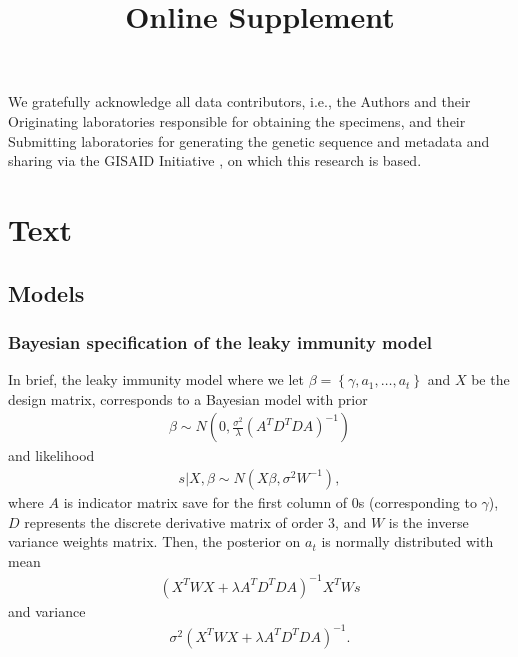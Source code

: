 \documentclass{article}
\newcommand{\beginsupplement}{
  \setcounter{table}{1}  
  \renewcommand{\thetable}{S\arabic{table}} 
  \setcounter{figure}{1} 
  \renewcommand{\thefigure}{S\arabic{figure}}
  \setcounter{section}{0} 
  \renewcommand{\thesection}{S\arabic{section}}
}
\begin{document}
We gratefully acknowledge all data contributors, i.e., the Authors and their Originating laboratories responsible for obtaining the specimens, and their Submitting laboratories for generating the genetic sequence and metadata and sharing via the GISAID Initiative \citep{elbe2017data}, on which this research is based.



\newpage


\newpage
\beginsupplement
\title{Online Supplement} 
\maketitle
\section{Text}  
\subsection{Models}
\subsubsection{Bayesian specification of the leaky immunity model}\label{supp:bayesleaky}
In brief, the leaky immunity model where we let $\beta = \left \{  \gamma, a_1,\dots, a_t \right \}$ and $X$ be the design matrix, corresponds to a Bayesian model with prior 
\begin{align*}
    \beta \sim N\left ( 0,  \frac{\sigma^2 }{ \lambda} \left ( A^TD^TDA \right ) ^{-1}  \right )
\end{align*} and likelihood 
\begin{align*}
    s|X,\beta \sim N \left( X\beta, \sigma^2W^{-1} \right ),
\end{align*} where $A$ is indicator matrix save for the first column of $0$s (corresponding to $\gamma$), $D$ represents the discrete derivative matrix of order $3$, and $W$ is the inverse variance weights matrix. Then, the posterior on $a_t$ is normally distributed with mean 
\begin{align*}
    \left ( X^TWX + \lambda A^TD^TDA \right )^{-1}X^TWs
\end{align*} 
and variance 
\begin{align*}
    \sigma^2 (X^TWX + \lambda A^TD^TDA)^{-1}.
\end{align*}
\end{document}
